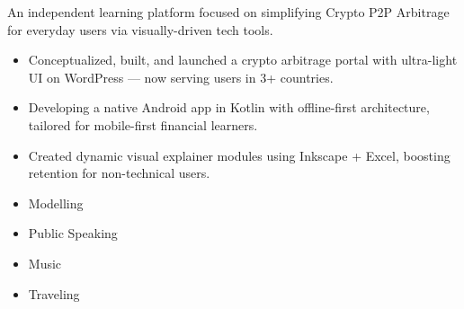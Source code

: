 \documentclass[10pt,a4paper,ragged2e,withhyper]{altacv}
\begin{document}
\begin{paracol}{2}


An independent learning platform focused on simplifying Crypto P2P Arbitrage for everyday users via visually-driven tech tools.\\[1ex]
\begin{itemize}
    \item Conceptualized, built, and launched a crypto arbitrage portal with ultra-light UI on WordPress — now serving users in 3+ countries.
    \item Developing a native Android app in Kotlin with offline-first architecture, tailored for mobile-first financial learners.
    \item Created dynamic visual explainer modules using Inkscape + Excel, boosting retention for non-technical users.
\end{itemize}



\medskip


\begin{itemize}
\item Modelling
\item Public Speaking
\item Music
\item Traveling
\end{itemize}




\end{paracol}
\end{document}
